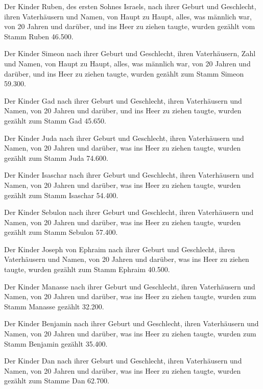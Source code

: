  Der Kinder Ruben, des ersten Sohnes Israels, nach ihrer
Geburt und Geschlecht, ihren Vaterhäusern und Namen, von Haupt zu Haupt,
alles, was männlich war, von 20 Jahren und darüber, und ins Heer zu
ziehen taugte,  wurden gezählt vom Stamm Ruben 46.500.

 Der Kinder Simeon nach ihrer Geburt und Geschlecht,
ihren Vaterhäusern, Zahl und Namen, von Haupt zu Haupt, alles, was
männlich war, von 20 Jahren und darüber, und ins Heer zu ziehen taugte,
 wurden gezählt zum Stamm Simeon 59.300.

 Der Kinder Gad nach ihrer Geburt und Geschlecht, ihren
Vaterhäusern und Namen, von 20 Jahren und darüber, und ins Heer zu
ziehen taugte,  wurden gezählt zum Stamm Gad 45.650.

 Der Kinder Juda nach ihrer Geburt und Geschlecht, ihren
Vaterhäusern und Namen, von 20 Jahren und darüber, was ins Heer zu
ziehen taugte,  wurden gezählt zum Stamm Juda 74.600.

 Der Kinder Isaschar nach ihrer Geburt und Geschlecht,
ihren Vaterhäusern und Namen, von 20 Jahren und darüber, was ins Heer zu
ziehen taugte,  wurden gezählt zum Stamm Isaschar 54.400.

 Der Kinder Sebulon nach ihrer Geburt und Geschlecht,
ihren Vaterhäusern und Namen, von 20 Jahren und darüber, was ins Heer zu
ziehen taugte,  wurden gezählt zum Stamm Sebulon 57.400.

 Der Kinder Joseph von Ephraim nach ihrer Geburt und
Geschlecht, ihren Vaterhäusern und Namen, von 20 Jahren und darüber, was
ins Heer zu ziehen taugte,  wurden gezählt zum Stamm
Ephraim 40.500.

 Der Kinder Manasse nach ihrer Geburt und Geschlecht,
ihren Vaterhäusern und Namen, von 20 Jahren und darüber, was ins Heer zu
ziehen taugte,  wurden zum Stamm Manasse gezählt 32.200.

 Der Kinder Benjamin nach ihrer Geburt und Geschlecht,
ihren Vaterhäusern und Namen, von 20 Jahren und darüber, was ins Heer zu
ziehen taugte,  wurden zum Stamm Benjamin gezählt 35.400.

 Der Kinder Dan nach ihrer Geburt und Geschlecht, ihren
Vaterhäusern und Namen, von 20 Jahren und darüber, was ins Heer zu
ziehen taugte,  wurden gezählt zum Stamme Dan 62.700.

